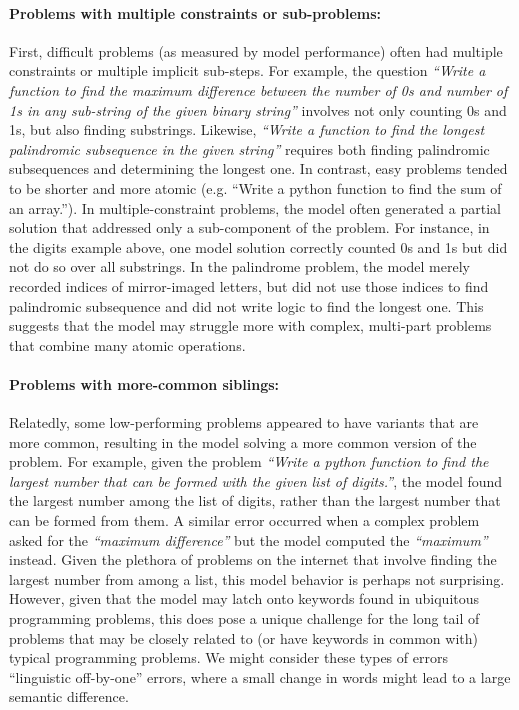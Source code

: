 \paragraph{Problems with multiple constraints or sub-problems:} First, difficult problems (as measured by model performance) often had multiple constraints or multiple implicit sub-steps. For example, the question \textit{``Write a function to find the maximum difference between the number of 0s and number of 1s in any sub-string of the given binary string”} involves not only counting 0s and 1s, but also finding substrings. Likewise, \textit{``Write a function to find the longest palindromic subsequence in the given string”} requires both finding palindromic subsequences and determining the longest one. In contrast, easy problems tended to be shorter and more atomic (e.g. ``Write a python function to find the sum of an array.”). In multiple-constraint problems, the model often generated a partial solution that addressed only a sub-component of the problem. For instance, in the digits example above, one model solution correctly counted 0s and 1s but did not do so over all substrings. In the palindrome problem, the model merely recorded indices of mirror-imaged letters, but did not use those indices to find palindromic subsequence and did not write logic to find the longest one. This suggests that the model may struggle more with complex, multi-part problems that combine many atomic operations.

\paragraph{Problems with more-common siblings:} Relatedly, some low-performing problems appeared to have variants that are more common, resulting in the model solving a more common version of the problem. For example, given the problem \textit{``Write a python function to find the largest number that can be formed with the given list of digits.”}, the model found the largest number among the list of digits, rather than the largest number that can be formed from them. A similar error occurred when a complex problem asked for the \textit{``maximum difference”} but the model computed the \textit{``maximum”} instead. Given the plethora of problems on the internet that involve finding the largest number from among a list, this model behavior is perhaps not surprising. However, given that the model may latch onto keywords found in ubiquitous programming problems, this does pose a unique challenge for the long tail of problems that may be closely related to (or have keywords in common with) typical programming problems. We might consider these types of errors ``linguistic off-by-one” errors, where a small change in words might lead to a large semantic difference.

